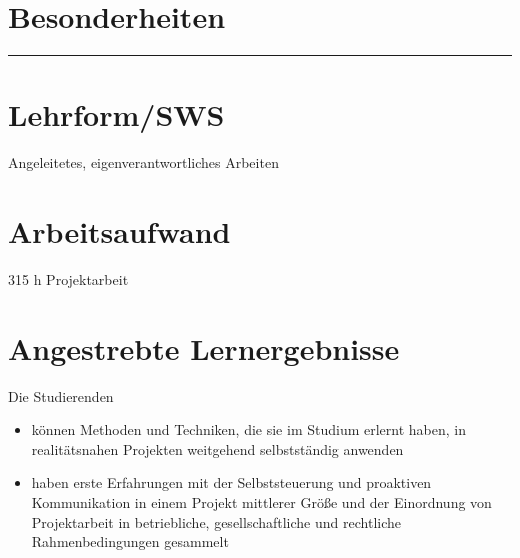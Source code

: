 \hypertarget{besonderheitenpathlabel....srcmodulbeschreibungen-bachelor-bpo5BA_Praxisprojekt}{%
\section*{Besonderheiten\label{../../src/modulbeschreibungen-bachelor-bpo5/BA_Praxisprojekt}}\label{besonderheitenpathlabel....srcmodulbeschreibungen-bachelor-bpo5BA_Praxisprojekt}}

\begin{center}\rule{0.5\linewidth}{0.5pt}\end{center}

\hypertarget{lehrformswspathlabel....srcmodulbeschreibungen-bachelor-bpo5BA_Praxisprojekt}{%
\section*{Lehrform/SWS\label{../../src/modulbeschreibungen-bachelor-bpo5/BA_Praxisprojekt}}\label{lehrformswspathlabel....srcmodulbeschreibungen-bachelor-bpo5BA_Praxisprojekt}}

Angeleitetes, eigenverantwortliches Arbeiten

\hypertarget{arbeitsaufwandpathlabel....srcmodulbeschreibungen-bachelor-bpo5BA_Praxisprojekt}{%
\section*{Arbeitsaufwand\label{../../src/modulbeschreibungen-bachelor-bpo5/BA_Praxisprojekt}}\label{arbeitsaufwandpathlabel....srcmodulbeschreibungen-bachelor-bpo5BA_Praxisprojekt}}

315 h Projektarbeit

\hypertarget{angestrebte-lernergebnissepathlabel....srcmodulbeschreibungen-bachelor-bpo5BA_Praxisprojekt}{%
\section*{Angestrebte
Lernergebnisse\label{../../src/modulbeschreibungen-bachelor-bpo5/BA_Praxisprojekt}}\label{angestrebte-lernergebnissepathlabel....srcmodulbeschreibungen-bachelor-bpo5BA_Praxisprojekt}}

Die Studierenden

\begin{itemize}
\tightlist
\item
  können Methoden und Techniken, die sie im Studium erlernt haben, in
  realitätsnahen Projekten weitgehend selbstständig anwenden
\item
  haben erste Erfahrungen mit der Selbststeuerung und proaktiven
  Kommunikation in einem Projekt mittlerer Größe und der Einordnung von
  Projektarbeit in betriebliche, gesellschaftliche und rechtliche
  Rahmenbedingungen gesammelt
\end{itemize}

